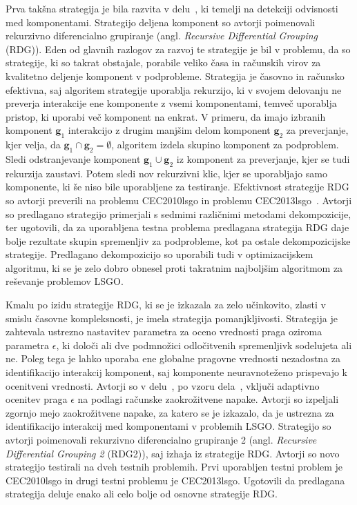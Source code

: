 Prva takšna strategija je bila razvita v delu~\cite{alg:rdg}, ki temelji na detekciji odvisnosti med komponentami.
Strategijo deljena komponent so avtorji poimenovali rekurzivno diferencialno grupiranje (angl. \textit{Recursive Differential Grouping} (RDG)).
Eden od glavnih razlogov za razvoj te strategije je bil v problemu, da so strategije, ki so takrat obstajale, porabile veliko časa in računskih virov za kvalitetno deljenje komponent v podprobleme.
Strategija je časovno in računsko efektivna, saj algoritem strategije uporablja rekurzijo, ki v svojem delovanju ne preverja interakcije ene komponente z vsemi komponentami, temveč uporablja pristop, ki uporabi več komponent na enkrat.
V primeru, da imajo izbranih komponent $\mathbf{g}_1$ interakcijo z drugim manjšim delom komponent $\mathbf{g}_2$ za preverjanje, kjer velja, da $\mathbf{g}_1 \cap \mathbf{g}_2 = \emptyset$, algoritem izdela skupino komponent za podproblem.
Sledi odstranjevanje komponent $\mathbf{g}_1 \cup \mathbf{g}_2$ iz komponent za preverjanje, kjer se tudi rekurzija zaustavi.
Potem sledi nov rekurzivni klic, kjer se uporabljajo samo komponente, ki še niso bile uporabljene za testiranje.
Efektivnost strategije RDG so avtorji preverili na problemu CEC2010lsgo in problemu CEC2013lsgo~\cite{bech:cec2013lsgo}.
Avtorji so predlagano strategijo primerjali s sedmimi različnimi metodami dekompozicije, ter ugotovili, da za uporabljena testna problema predlagana strategija RDG daje bolje rezultate skupin spremenljiv za podprobleme, kot pa ostale dekompozicijske strategije.
Predlagano dekompozicijo so uporabili tudi v optimizacijskem algoritmu, ki se je zelo dobro obnesel proti takratnim najboljšim algoritmom za reševanje problemov LSGO.

Kmalu po izidu strategije RDG, ki se je izkazala za zelo učinkovito, zlasti v smislu časovne kompleksnosti, je imela strategija pomanjkljivosti.
Strategija je zahtevala ustrezno nastavitev parametra za oceno vrednosti praga oziroma parametra $\epsilon$, ki določi ali dve podmnožici odločitvenih spremenljivk sodelujeta ali ne.
Poleg tega je lahko uporaba ene globalne pragovne vrednosti nezadostna za identifikacijo interakcij komponent, saj komponente neuravnoteženo prispevajo k ocenitveni vrednosti.
Avtorji so v delu~\cite{alg:rdg2}, po vzoru dela~\cite{alg:dg2}, vključi adaptivno ocenitev praga $\epsilon$ na podlagi računske zaokrožitvene napake.
Avtorji so izpeljali zgornjo mejo zaokrožitvene napake, za katero se je izkazalo, da je ustrezna za identifikacijo interakcij med komponentami v problemih LSGO.
Strategijo so avtorji poimenovali rekurzivno diferencialno grupiranje 2 (angl. \textit{Recursive Differential Grouping 2} (RDG2)), saj izhaja iz strategije RDG.
Avtorji so novo strategijo testirali na dveh testnih problemih.
Prvi uporabljen testni problem je CEC2010lsgo in drugi testni problemu je CEC2013lsgo.
Ugotovili da predlagana strategija deluje enako ali celo bolje od osnovne strategije RDG.

